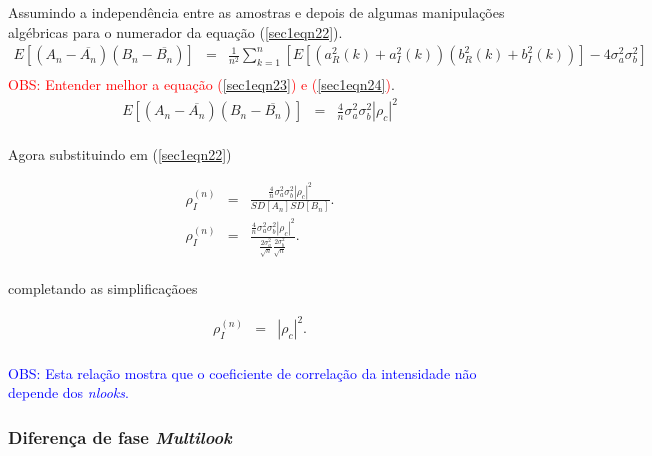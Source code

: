 \documentclass[10pt,a4paper]{article}
\begin{document}
Assumindo a independência entre as amostras e depois de algumas manipulações algébricas para o numerador da equação (\ref{sec1eqn22}). 
\begin{equation}\label{sec1eqn23}
\begin{array}{ccc}
	E[(A_n-\overline{A_n})(B_n-\overline{B_n})]&=&\frac{1}{n^2}{\displaystyle{\sum_{k=1}^{n}[E[(a_{R}^2(k)+a_{I}^2(k))(b_{R}^2(k)+b_{I}^2(k))]-4\sigma_a^2\sigma_b^2] }}\\
\end{array}
\end{equation}
\textcolor{red}{OBS: Entender melhor a equação (\ref{sec1eqn23}) e (\ref{sec1eqn24})}.
\begin{equation}\label{sec1eqn24}
\begin{array}{ccc}
	E[(A_n-\overline{A_n})(B_n-\overline{B_n})]&=&\frac{4}{n}\sigma_a^2\sigma_b^2\left|\rho_c\right|^2\\
\end{array}
\end{equation}

Agora substituindo em (\ref{sec1eqn22})

\begin{equation}\label{sec1eqn25}
\begin{array}{ccc}
	\rho_I^{(n)}&=&\frac{\frac{4}{n}\sigma_a^2\sigma_b^2\left|\rho_c\right|^2}{SD[A_n]SD[B_n]}. \\
	\rho_I^{(n)}&=&\frac{\frac{4}{n}\sigma_a^2\sigma_b^2\left|\rho_c\right|^2}{\frac{2\sigma_a^2}{\sqrt{n}}\frac{2\sigma_b^2}{\sqrt{n}}}. \\
\end{array}
\end{equation}

completando as simplificaçãoes

\begin{equation}\label{sec1eqn26}
\begin{array}{ccc}
	\rho_I^{(n)}&=&\left|\rho_c\right|^2. \\
\end{array}
\end{equation}

\textcolor{blue}{OBS: Esta relação mostra que o coeficiente de correlação da intensidade não depende dos {\it nlooks}.}

\subsubsection{Diferença de fase {\it Multilook}}
\end{document}
